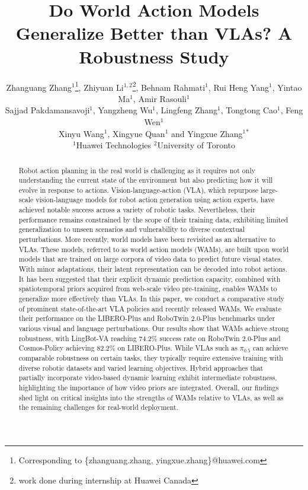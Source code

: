 \documentclass{article}
\title{Do World Action Models Generalize Better than VLAs? A Robustness Study}
\author{
Zhanguang Zhang$^{1}$\thanks{Corresponding to \{zhanguang.zhang, yingxue.zhang\}@huawei.com}, Zhiyuan Li$^{1,2}$\thanks{work done during internship at Huawei Canada}, Behnam Rahmati$^{1}$, Rui Heng Yang$^{1}$, Yintao Ma$^{1}$, Amir Rasouli$^{1}$\\
\vspace{-0.14cm}
Sajjad Pakdamansavoji$^{1}$, Yangzheng Wu$^{1}$, Lingfeng Zhang$^{1}$, Tongtong Cao$^{1}$, Feng Wen$^{1}$\\
\vspace{0.1cm}
Xinyu Wang$^{1}$, Xingyue Quan$^{1}$ and Yingxue Zhang$^{1}$$^*$\\
\vspace{0.5cm}
$^{1}$Huawei Technologies \quad $^{2}$University of Toronto
}
\begin{document}
\maketitle

\begin{abstract}
Robot action planning in the real world is challenging as it requires not only understanding the current state of the environment but also predicting how it will evolve in response to actions. Vision-language-action (VLA), which repurpose large-scale vision-language models for robot action generation using action experts, have achieved notable success across a variety of robotic tasks. Nevertheless, their performance remains constrained by the scope of their training data, exhibiting limited generalization to unseen scenarios and vulnerability to diverse contextual perturbations. 
More recently, world models have been revisited as an alternative to VLAs. These models, referred to as world action models (WAMs), are built upon world models that are trained on large corpora of video data to predict future visual states. With minor adaptations, their latent representation can be decoded into robot actions. It has been suggested that their explicit dynamic prediction capacity, combined with spatiotemporal priors acquired from web-scale video pre-training, enables WAMs to generalize more effectively than VLAs. In this paper, we conduct a comparative study of prominent state-of-the-art VLA policies and recently released WAMs. We evaluate their performance on the LIBERO-Plus and RoboTwin 2.0-Plus benchmarks under various visual and language perturbations. Our results show that WAMs achieve strong robustness, with LingBot-VA reaching 74.2\% success rate on RoboTwin 2.0-Plus and Cosmos-Policy achieving 82.2\% on LIBERO-Plus. While VLAs such as $\pi_{0.5}$ can achieve comparable robustness on certain tasks, they typically require extensive training with diverse robotic datasets and varied learning objectives. Hybrid approaches that partially incorporate video-based dynamic learning exhibit intermediate robustness, highlighting the importance of how video priors are integrated. Overall, our findings shed light on critical insights into the strengths of WAMs relative to VLAs, as well as the remaining challenges for real-world deployment.
\end{abstract}
\end{document}
